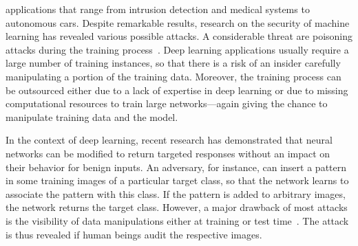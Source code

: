 \documentclass[conference]{IEEEtran}
\begin{document}
applications that range from intrusion {detection\EndAccSupp{}} and medical 
{systems\EndAccSupp{}} to autonomous cars. Despite remarkable results, 
{research\EndAccSupp{}} on the {security\EndAccSupp{}} of machine {learning\EndAccSupp{}} has revealed various 
possible attacks.
A considerable threat are {poisoning\EndAccSupp{}} {attacks\EndAccSupp{}} during the {training\EndAccSupp{}} 
process~\citep[e.g.][]{BigNelLas11, GuDolGar17, LiuMaAaf+18}. 
{Deep\EndAccSupp{}} {learning\EndAccSupp{}} applications usually require a large number of 
{training\EndAccSupp{}} instances, so that there is a risk of an insider carefully 
manipulating a portion of the training data. Moreover, the training 
process can be outsourced either due to a lack of expertise in deep 
learning or due to missing {computational\EndAccSupp{}} resources to train large 
{networks\EndAccSupp{}}---again giving the chance to manipulate training data and the 
model.

In the context of deep learning, recent research has demonstrated that 
{neural\EndAccSupp{}} {networks\EndAccSupp{}} can be modified to return {targeted\EndAccSupp{}} responses without an 
{impact\EndAccSupp{}} on their behavior for {benign\EndAccSupp{}} inputs. An {adversary\EndAccSupp{}}, for instance, 
can insert a {pattern\EndAccSupp{}} in some training {images\EndAccSupp{}} of a particular 
{target\EndAccSupp{}} class, so that the {network\EndAccSupp{}} learns to associate the pattern with 
this class. If the pattern is added to arbitrary {images\EndAccSupp{}}, the network 
returns the {target\EndAccSupp{}} class.
However, a major drawback of most {attacks\EndAccSupp{}} is the visibility of data 
manipulations either at training or {test\EndAccSupp{}} time~\citep{GuDolGar17, 
LiuMaAaf+18}. The {attack\EndAccSupp{}} is thus revealed if human beings 
audit the respective images. 
\end{document}
